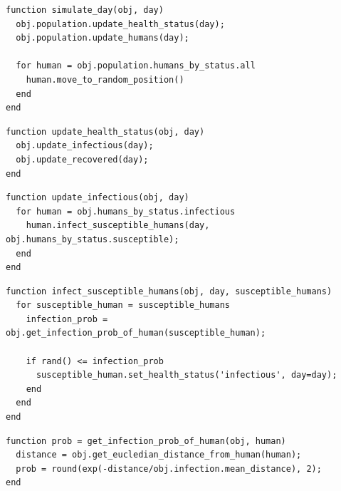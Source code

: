 \documentclass[a4paper]{article}
\newcommand{\code}{\texttt}
\begin{document}
\begin{lstlisting}[caption={Function for simulating one day, where \code{obj} is \code{city}.}, captionpos=b, label={code:simulate-day}]
function simulate_day(obj, day)	
  obj.population.update_health_status(day);
  obj.population.update_humans(day);
	
  for human = obj.population.humans_by_status.all
    human.move_to_random_position()
  end
end
\end{lstlisting}


\begin{lstlisting}[caption={Function for updating the health status of the population on a given day, where \code{obj} is \code{population}.}, captionpos=b, label={code:update-health-status}]
function update_health_status(obj, day)		
  obj.update_infectious(day);
  obj.update_recovered(day);
end
\end{lstlisting}

\begin{lstlisting}[caption={Function for updating infectious humans, i.e., deciding which human will be infected, on a given day, where \code{obj} is \code{population}.}, captionpos=b, label={code:update-infectious}]
function update_infectious(obj, day)
  for human = obj.humans_by_status.infectious
    human.infect_susceptible_humans(day, obj.humans_by_status.susceptible);
  end
end
\end{lstlisting}

\begin{lstlisting}[caption={Function for infecting susceptible humans by an infectious human on a given day, where \code{obj} is \code{human} - specifically, an instance of \code{human} whose health status is infectious.}, captionpos=b, label={code:infect-susceptible-humans}]
function infect_susceptible_humans(obj, day, susceptible_humans)
  for susceptible_human = susceptible_humans                
    infection_prob = obj.get_infection_prob_of_human(susceptible_human);

    if rand() <= infection_prob
      susceptible_human.set_health_status('infectious', day=day);
    end
  end                
end
\end{lstlisting}

\begin{lstlisting}[caption={Function for getting the probability of infection between an infectious human and a susceptible human, where \code{obj} is \code{human} - specifically, an instance of \code{human} whose health status is infectious.}, captionpos=b, label={code:get-infection-prob-of-human}]
function prob = get_infection_prob_of_human(obj, human)		
  distance = obj.get_eucledian_distance_from_human(human);
  prob = round(exp(-distance/obj.infection.mean_distance), 2);
end
\end{lstlisting}
\end{document}
